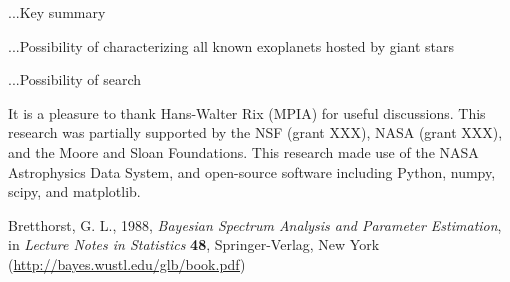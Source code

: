 \documentclass[12pt, preprint]{aastex}
\begin{document}
...Key summary

...Possibility of characterizing all known exoplanets hosted by giant stars

...Possibility of search

\acknowledgements
It is a pleasure to thank
  Hans-Walter Rix (MPIA)
for useful discussions.
This research was partially supported by the NSF (grant XXX), NASA
(grant XXX), and the Moore and Sloan Foundations.
This research made use of the NASA Astrophysics Data System, and
open-source software including Python, numpy, scipy, and matplotlib.

\begin{thebibliography}{}\raggedright
{}
  Bretthorst, G. L., 1988,
  \textit{Bayesian Spectrum Analysis and Parameter Estimation},
  in \textit{Lecture Notes in Statistics} \textbf{48},
  Springer-Verlag, New York
  \footnotesize{(\url{http://bayes.wustl.edu/glb/book.pdf})}
\end{thebibliography}
\end{document}
